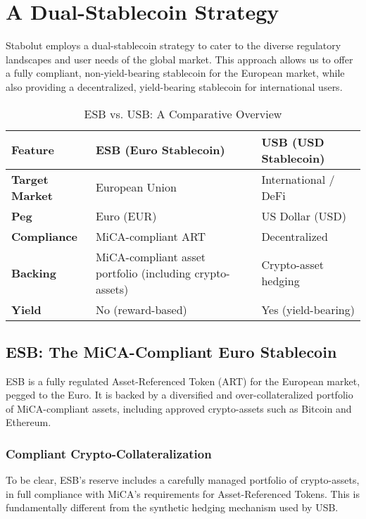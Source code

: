\section{A Dual-Stablecoin Strategy}
Stabolut employs a dual-stablecoin strategy to cater to the diverse regulatory landscapes and user needs of the global market. This approach allows us to offer a fully compliant, non-yield-bearing stablecoin for the European market, while also providing a decentralized, yield-bearing stablecoin for international users.

\begin{table}[h!]
\centering
\renewcommand{\arraystretch}{1.2}
\begin{tabular}{|l|p{6cm}|p{6cm}|}
\hline
\textbf{Feature} & \textbf{ESB (Euro Stablecoin)} & \textbf{USB (USD Stablecoin)} \\
\hline
\textbf{Target Market} & European Union & International / DeFi \\
\hline
\textbf{Peg} & Euro (EUR) & US Dollar (USD) \\
\hline
\textbf{Compliance} & MiCA-compliant ART & Decentralized \\
\hline
\textbf{Backing} & MiCA-compliant asset portfolio (including crypto-assets) & Crypto-asset hedging \\
\hline
\textbf{Yield} & No (reward-based) & Yes (yield-bearing) \\
\hline
\end{tabular}
\caption{ESB vs. USB: A Comparative Overview}
\label{tab:esbvsusb}
\end{table}

\subsection{ESB: The MiCA-Compliant Euro Stablecoin}
ESB is a fully regulated Asset-Referenced Token (ART) for the European market, pegged to the Euro. It is backed by a diversified and over-collateralized portfolio of MiCA-compliant assets, including approved crypto-assets such as Bitcoin and Ethereum.

\subsubsection{Compliant Crypto-Collateralization}
To be clear, ESB's reserve includes a carefully managed portfolio of crypto-assets, in full compliance with MiCA's requirements for Asset-Referenced Tokens. This is fundamentally different from the synthetic hedging mechanism used by USB.

